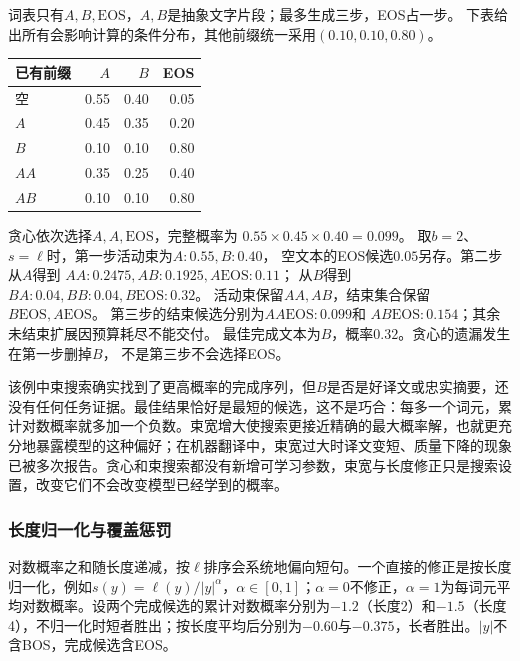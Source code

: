 \begin{example}[三步生成中的一次早期遗漏]
  \label{ex:nlp-generation-beam}
  词表只有$A,B,\mathrm{EOS}$，$A,B$是抽象文字片段；最多生成三步，EOS占一步。
  下表给出所有会影响计算的条件分布，其他前缀统一采用$(0.10,0.10,0.80)$。
  \begin{center}
    \begin{tabular}{@{}lrrr@{}}
      \toprule
      已有前缀 & $A$ & $B$ & EOS\\
      \midrule
      空 & 0.55 & 0.40 & 0.05\\
      $A$ & 0.45 & 0.35 & 0.20\\
      $B$ & 0.10 & 0.10 & 0.80\\
      $AA$ & 0.35 & 0.25 & 0.40\\
      $AB$ & 0.10 & 0.10 & 0.80\\
      \bottomrule
    \end{tabular}
  \end{center}
  贪心依次选择$A,A,\mathrm{EOS}$，完整概率为
  $0.55\times0.45\times0.40=0.099$。
  取$b=2$、$s=\ell$时，第一步活动束为$A:0.55,B:0.40$，
  空文本的EOS候选$0.05$另存。第二步从$A$得到
  $AA:0.2475,AB:0.1925,A\mathrm{EOS}:0.11$；
  从$B$得到$BA:0.04,BB:0.04,B\mathrm{EOS}:0.32$。
  活动束保留$AA,AB$，结束集合保留$B\mathrm{EOS},A\mathrm{EOS}$。
  第三步的结束候选分别为$AA\mathrm{EOS}:0.099$和
  $AB\mathrm{EOS}:0.154$；其余未结束扩展因预算耗尽不能交付。
  最佳完成文本为$B$，概率$0.32$。贪心的遗漏发生在第一步删掉$B$，
  不是第三步不会选择EOS。
\end{example}

该例中束搜索确实找到了更高概率的完成序列，但$B$是否是好译文或忠实摘要，还没有任何任务证据。最佳结果恰好是最短的候选，这不是巧合：每多一个词元，累计对数概率就多加一个负数。束宽增大使搜索更接近精确的最大概率解，也就更充分地暴露模型的这种偏好；在机器翻译中，束宽过大时译文变短、质量下降的现象已被多次报告。贪心和束搜索都没有新增可学习参数，束宽与长度修正只是搜索设置，改变它们不会改变模型已经学到的概率。

\subsubsection{长度归一化与覆盖惩罚}
\label{sec:nlp-inference-length-penalty}

对数概率之和随长度递减，按$\ell$排序会系统地偏向短句。一个直接的修正是按长度归一化，例如$s(y)=\ell(y)/|y|^{\alpha}$，$\alpha\in[0,1]$；$\alpha=0$不修正，$\alpha=1$为每词元平均对数概率。设两个完成候选的累计对数概率分别为$-1.2$（长度2）和$-1.5$（长度4），不归一化时短者胜出；按长度平均后分别为$-0.60$与$-0.375$，长者胜出。$|y|$不含BOS，完成候选含EOS。

